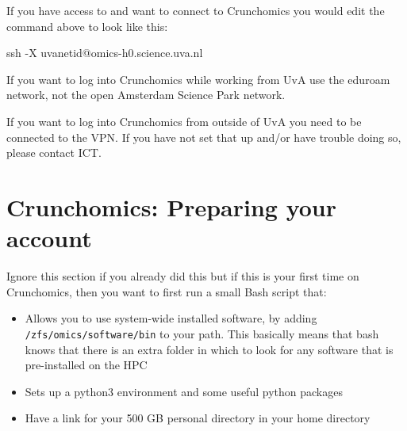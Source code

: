 \documentclass[
  letterpaper,
  DIV=11,
  numbers=noendperiod]{scrreprt}
\newenvironment{Shaded}{}{}
\newcommand{\AttributeTok}[1]{\textcolor[rgb]{0.84,0.23,0.29}{#1}}
\newcommand{\FunctionTok}[1]{\textcolor[rgb]{0.44,0.26,0.76}{#1}}
\newcommand{\NormalTok}[1]{\textcolor[rgb]{0.14,0.16,0.18}{#1}}
\providecommand{\tightlist}{%
  \setlength{\itemsep}{0pt}\setlength{\parskip}{0pt}}\usepackage{longtable,booktabs,array}
\begin{document}
If you have access to and want to connect to Crunchomics you would edit
the command above to look like this:

\begin{Shaded}
\begin{Highlighting}[]
\FunctionTok{ssh} \AttributeTok{{-}X}\NormalTok{ uvanetid@omics{-}h0.science.uva.nl}
\end{Highlighting}
\end{Shaded}

\begin{tcolorbox}[enhanced jigsaw, colframe=quarto-callout-important-color-frame, title=\textcolor{quarto-callout-important-color}{\faExclamation}\hspace{0.5em}{Important}, titlerule=0mm, toptitle=1mm, left=2mm, colbacktitle=quarto-callout-important-color!10!white, bottomtitle=1mm, coltitle=black, breakable, colback=white, arc=.35mm, bottomrule=.15mm, rightrule=.15mm, leftrule=.75mm, opacityback=0, toprule=.15mm, opacitybacktitle=0.6]

If you want to log into Crunchomics while working from UvA use the
eduroam network, not the open Amsterdam Science Park network.

If you want to log into Crunchomics from outside of UvA you need to be
connected to the VPN. If you have not set that up and/or have trouble
doing so, please contact ICT.

\end{tcolorbox}

\section{Crunchomics: Preparing your
account}\label{crunchomics-preparing-your-account}

Ignore this section if you already did this but if this is your first
time on Crunchomics, then you want to first run a small Bash script
that:

\begin{itemize}
\tightlist
\item
  Allows you to use system-wide installed software, by adding
  \texttt{/zfs/omics/software/bin} to your path. This basically means
  that bash knows that there is an extra folder in which to look for any
  software that is pre-installed on the HPC
\item
  Sets up a python3 environment and some useful python packages
\item
  Have a link for your 500 GB personal directory in your home directory
\end{itemize}
\end{document}
